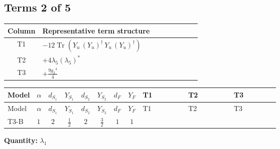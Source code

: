 \documentclass[8pt]{article}
\begin{document}
\begin{landscape}
\subsection*{Terms 2 of 5}
\begin{center}
\begin{tabular}{@{}c >{\raggedright\arraybackslash}p{0.82\linewidth}@{}}
\toprule
Column & Representative term structure \\
\midrule
T1 & \(\displaystyle -12 \operatorname{Tr}\!\left({Y_u}\,\left({Y_u}\right)^{\dagger}\,{Y_u}\,\left({Y_u}\right)^{\dagger}\right)\) \\
\midrule
T2 & \(\displaystyle +4 {\lambda_5} \left({\lambda_5}\right)^{*}\) \\
\midrule
T3 & \(\displaystyle +\frac{9 {g_2}^4}{4}\) \\
\midrule
\bottomrule
\end{tabular}
\end{center}
\smallskip
\tiny
\begin{longtable}{@{}llcccccc >{\raggedright\arraybackslash}p{0.21\linewidth} >{\raggedright\arraybackslash}p{0.21\linewidth} >{\raggedright\arraybackslash}p{0.21\linewidth}@{}}
\toprule
Model & $\alpha$ & $d_{S_1}$ & $Y_{S_1}$ & $d_{S_2}$ & $Y_{S_2}$ & $d_F$ & $Y_F$ & T1 & T2 & T3 \\
\midrule
\endfirsthead
\toprule
Model & $\alpha$ & $d_{S_1}$ & $Y_{S_1}$ & $d_{S_2}$ & $Y_{S_2}$ & $d_F$ & $Y_F$ & T1 & T2 & T3 \\
\midrule
\endhead
T3-B & $1$ & $2$ & $\frac{1}{2}$ & $2$ & $\frac{3}{2}$ & $1$ & $1$ & \scriptsize\adjustbox{max width=\linewidth}{$\begin{gathered} -12 \operatorname{Tr}\!\left({Y_u}\,\left({Y_u}\right)^{\dagger}\,{Y_u}\,\left({Y_u}\right)^{\dagger}\right)\end{gathered}$} & \scriptsize\adjustbox{max width=\linewidth}{$\begin{gathered} +4 {\lambda_5} \left({\lambda_5}\right)^{*}\end{gathered}$} & \scriptsize\adjustbox{max width=\linewidth}{$\begin{gathered} +\frac{9 {g_2}^4}{4}\end{gathered}$} \\
\midrule
\bottomrule
\end{longtable}
\clearpage
\noindent\textbf{Quantity: }$\lambda_1$\par\smallskip

\end{landscape}
\end{document}
